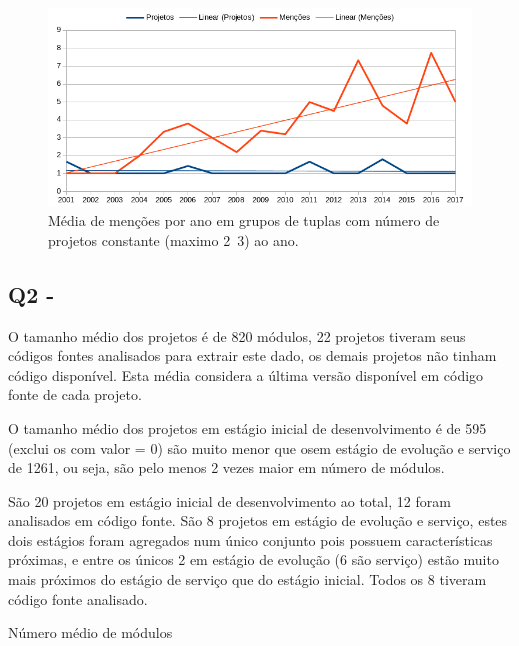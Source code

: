 \begin{figure}[h]
  \center
  \includegraphics[scale=0.6]{imagens/mentions-trend-without-projects.png}
  \caption{Média de menções por ano em grupos de tuplas com número de projetos constante (maximo 2~3) ao ano.}
  \label{mentions-trend-without-projects}
\end{figure}

\subsection{Q2 - \QuestaoDois} %

O tamanho médio dos projetos é de 820 módulos, 22 projetos tiveram seus códigos
fontes analisados para extrair este dado, os demais projetos não tinham
código disponível. Esta média considera a última versão disponível em código
fonte de cada projeto.

O tamanho médio dos projetos em estágio inicial de desenvolvimento é de 595
(exclui os com valor = 0) são muito menor que osem estágio de evolução e
serviço  de 1261, ou seja, são pelo menos 2 vezes maior em número de módulos.

São 20 projetos em estágio inicial de desenvolvimento ao total, 12 foram
analisados em código fonte. São 8 projetos em estágio de evolução e serviço,
estes dois estágios foram agregados num único conjunto pois possuem características
próximas, e entre os únicos 2 em estágio de evolução (6 são serviço) estão
muito mais próximos do estágio de serviço que do estágio inicial. Todos os 8
tiveram código fonte analisado.

Número médio de módulos


